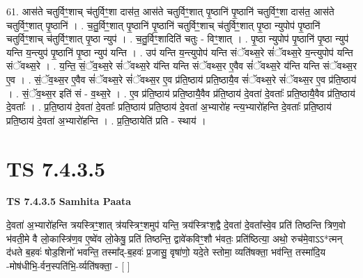 \documentclass[17pt]{extarticle}
\begin{document}
61. आस॑ते चतुर्विꣳ॒॒शाच् च॑तुर्विꣳ॒॒शा दास॑त॒ आस॑ते चतुर्विꣳ॒॒शात् पृ॒ष्ठानि॑ पृ॒ष्ठानि॑ चतुर्विꣳ॒॒शा दास॑त॒ आस॑ते चतुर्विꣳ॒॒शात् पृ॒ष्ठानि॑ । . च॒तु॒र्विꣳ॒॒शात् पृ॒ष्ठानि॑ पृ॒ष्ठानि॑ चतुर्विꣳ॒॒शाच् च॑तुर्विꣳ॒॒शात् पृ॒ष्ठा न्युपोप॑ पृ॒ष्ठानि॑ चतुर्विꣳ॒॒शाच् च॑तुर्विꣳ॒॒शात् पृ॒ष्ठा न्युप॑ । . च॒तु॒र्विꣳ॒॒शादिति॑ चतुः - विꣳ॒॒शात् । . पृ॒ष्ठा न्युपोप॑ पृ॒ष्ठानि॑ पृ॒ष्ठा न्युप॑ यन्ति य॒न्त्युप॑ पृ॒ष्ठानि॑ पृ॒ष्ठा न्युप॑ यन्ति । . उप॑ यन्ति य॒न्त्युपोप॑ यन्ति संॅवथ्स॒रे सं॑ॅवथ्स॒रे य॒न्त्युपोप॑ यन्ति संॅवथ्स॒रे । . य॒न्ति॒ सं॒ॅव॒थ्स॒रे सं॑ॅवथ्स॒रे य॑न्ति यन्ति संॅवथ्स॒र ए॒वैव सं॑ॅवथ्स॒रे य॑न्ति यन्ति संॅवथ्स॒र ए॒व । . सं॒ॅव॒थ्स॒र ए॒वैव सं॑ॅवथ्स॒रे सं॑ॅवथ्स॒र ए॒व प्र॑ति॒ष्ठाय॑ प्रति॒ष्ठायै॒व सं॑ॅवथ्स॒रे सं॑ॅवथ्स॒र ए॒व प्र॑ति॒ष्ठाय॑ । . सं॒ॅव॒थ्स॒र इति॑ सं - व॒थ्स॒रे । . ए॒व प्र॑ति॒ष्ठाय॑ प्रति॒ष्ठायै॒वैव प्र॑ति॒ष्ठाय॑ दे॒वता॑ दे॒वताः᳚ प्रति॒ष्ठायै॒वैव प्र॑ति॒ष्ठाय॑ दे॒वताः᳚ । . प्र॒ति॒ष्ठाय॑ दे॒वता॑ दे॒वताः᳚ प्रति॒ष्ठाय॑ प्रति॒ष्ठाय॑ दे॒वता॑ अ॒भ्यारो॑ह न्त्य॒भ्यारो॑हन्ति दे॒वताः᳚ प्रति॒ष्ठाय॑ प्रति॒ष्ठाय॑ दे॒वता॑ अ॒भ्यारो॑हन्ति । . प्र॒ति॒ष्ठायेति॑ प्रति - स्थाय॑ । \newline
\pagebreak
{}

\section{ TS 7.4.3.5 }

\textbf{TS 7.4.3.5 } \newline
\textbf{Samhita Paata} \newline

दे॒वता॑ अ॒भ्यारो॑हन्ति त्रयस्त्रिꣳ॒॒शात् त्र॑यस्त्रिꣳ॒॒शमुप॑ यन्ति॒ त्रय॑स्त्रिꣳश॒द्वै दे॒वता॑ दे॒वता᳚स्वे॒व प्रति॑ तिष्ठन्ति त्रिण॒वो भ॑वती॒मे वै लो॒कास्त्रि॑ण॒व ए॒ष्वे॑व लो॒केषु॒ प्रति॑ तिष्ठन्ति॒ द्वावे॑कविꣳ॒॒शौ भ॑वतः॒ प्रति॑ष्ठित्या॒ अथो॒ रुच॑मे॒वाऽऽ*त्मन् द॑धते ब॒हवः॑ षोड॒शिनो॑ भवन्ति॒ तस्मा᳚द्-ब॒हवः॑ प्र॒जासु॒ वृषा॑णो॒ यदे॒ते स्तोमा॒ व्यति॑षक्ता॒ भव॑न्ति॒ तस्मा॑दि॒य -मोष॑धीभि॒-र्वन॒स्पति॑भि॒-र्व्यति॑षक्ता॒ - [  ] \newline
\end{document}
